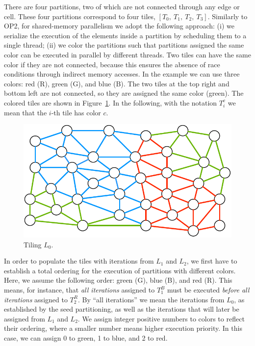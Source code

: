 There are four partitions, two of which are not connected through any edge or cell. These four partitions correspond to four tiles, $[T_0,\ T_1,\ T_2,\ T_3]$. Similarly to OP2, for shared-memory parallelism we adopt the following approach: (i) we serialize the execution of the elements inside a partition by scheduling them to a single thread; (ii) we color the partitions such that partitions assigned the same color can be executed in parallel by different threads. Two tiles can have the same color if they are not connected, because this ensures the absence of race conditions through indirect memory accesses. In the example we can use three colors: red (R), green (G), and blue (B). The two tiles at the top right and bottom left are not connected, so they are assigned the same color (green). The colored tiles are shown in Figure~\ref{fig:st-loop-0}. In the following, with the notation $T_i^c$ we mean that the $i$-th tile has color $c$. 

\begin{figure}[b]
\centering
\includegraphics[scale=0.7]{sparsetiling/figures/loop_0.pdf}
\caption{Tiling $L_0$.}
\label{fig:st-loop-0}
\end{figure}

In order to populate the tiles with iterations from $L_1$ and $L_2$, we first have to establish a total ordering for the execution of partitions with different colors. Here, we assume the following order: green (G), blue (B), and red (R). This means, for instance, that \textit{all iterations} assigned to $T_1^B$ must be executed \textit{before all iterations} assigned to $T_2^R$. By ``all iterations'' we mean the iterations from $L_0$, as established by the seed partitioning, as well as the iterations that will later be assigned from $L_1$ and $L_2$. We assign integer positive numbers to colors to reflect their ordering, where a smaller number means higher execution priority. In this case, we can assign 0 to green, 1 to blue, and 2 to red.


